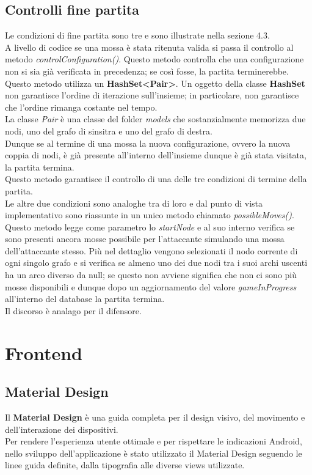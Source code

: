\documentclass[a4paper,11pt,twoside,openright]{report}
\begin{document}
\subsection{Controlli fine partita}
Le condizioni di fine partita sono tre e sono illustrate nella sezione 4.3.\\
A livello di codice se una mossa è stata ritenuta valida si passa il controllo al metodo \textit{controlConfiguration()}. Questo metodo controlla che una configurazione non si sia già verificata in precedenza; se così fosse, la partita terminerebbe.\\
Questo metodo utilizza un \textbf{HashSet<Pair>}. Un oggetto della classe \textbf{HashSet} non garantisce l'ordine di iterazione sull'insieme; in particolare, non garantisce che l'ordine rimanga costante nel tempo\cite{13}.\\
La classe \textit{Pair} è una classe del folder \textit{models} che sostanzialmente memorizza due nodi, uno del grafo di sinsitra e uno del grafo di destra.\\
Dunque se al termine di una mossa la nuova configurazione, ovvero la nuova coppia di nodi, è già presente all'interno dell'insieme dunque è già stata visitata, la partita termina.\\
Questo metodo garantisce il controllo di una delle tre condizioni di termine della partita.\\
Le altre due condizioni sono analoghe tra di loro e dal punto di vista implementativo sono riassunte in un unico metodo chiamato \textit{possibleMoves()}. Questo metodo legge come parametro lo \textit{startNode} e al suo interno verifica se sono presenti ancora mosse possibile per l'attaccante simulando una mossa dell'attaccante stesso. Più nel dettaglio vengono selezionati il nodo corrente di ogni singolo grafo e si verifica se almeno uno dei due nodi tra i suoi archi uscenti ha un arco diverso da null; se questo non avviene significa che non ci sono più mosse disponibili e dunque dopo un aggiornamento del valore \textit{gameInProgress} all'interno del database la partita termina.\\
Il discorso è analago per il difensore.

\section{Frontend}
\subsection{Material Design}
Il \textbf{Material Design} \cite{10} è una guida completa per il design visivo, del movimento e dell'interazione dei dispositivi.\\
Per rendere l'esperienza utente ottimale e per rispettare le indicazioni Android, nello sviluppo dell'applicazione è stato utilizzato il Material Design seguendo le linee guida definite, dalla tipografia alle diverse views utilizzate.
\end{document}
